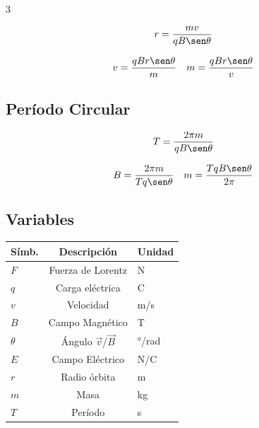 \documentclass[9pt, landscape, letterpaper]{extarticle}
\begin{document}
\begin{multicols}{3}
  \begin{formulabox}
    $$r = \frac{m v}{q B \sen\theta}$$
  \end{formulabox}

  \begin{despejesbox}[Despejes]
    $$v = \frac{q B r \sen\theta}{m} \quad m = \frac{q B r \sen\theta}{v}$$
  \end{despejesbox}

  \subsection{Período Circular}

  \begin{formulabox}
    $$T = \frac{2\pi m}{q B \sen\theta}$$
  \end{formulabox}

  \begin{despejesbox}[Despejes]
    $$B = \frac{2\pi m}{T q \sen\theta} \quad m = \frac{T q B \sen\theta}{2\pi}$$
  \end{despejesbox}

  \subsection{Variables}

  \begin{tablabox}
    \tablacompacta
    \begin{tabular}{@{}lcl@{}}
      \toprule
      Símb.    & Descripción                & Unidad \\
      \midrule
      $F$      & Fuerza de Lorentz          & N      \\
      $q$      & Carga eléctrica            & C      \\
      $v$      & Velocidad                  & m/s    \\
      $B$      & Campo Magnético            & T      \\
      $\theta$ & Ángulo $\vec{v}$/$\vec{B}$ & °/rad  \\
      $E$      & Campo Eléctrico            & N/C    \\
      $r$      & Radio órbita               & m      \\
      $m$      & Masa                       & kg     \\
      $T$      & Período                    & s      \\
      \bottomrule
    \end{tabular}
  \end{tablabox}


\end{multicols}
\end{document}
